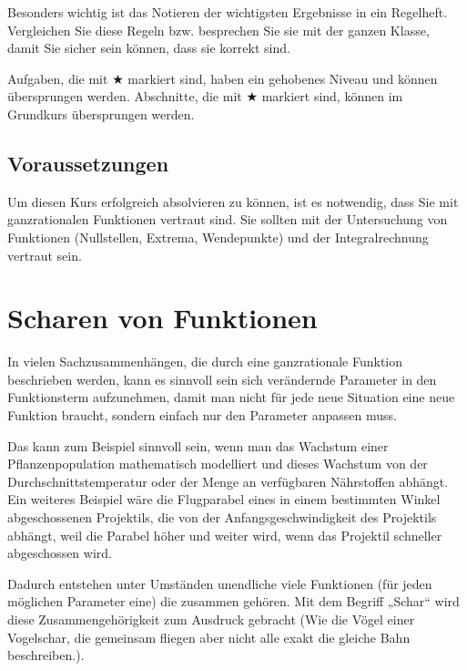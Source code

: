 \documentclass[11pt,a4paper,twoside,fleqn]{article}
\begin{document}
Besonders wichtig ist das Notieren der wichtigsten Ergebnisse in ein
Regelheft. Vergleichen Sie diese Regeln bzw. besprechen Sie sie mit
der ganzen Klasse, damit Sie sicher sein können, dass sie korrekt
sind.

Aufgaben, die mit $\bigstar$ markiert sind, haben ein gehobenes Niveau
und können übersprungen werden.
Abschnitte, die mit $\bigstar$ markiert sind, können im Grundkurs
übersprungen werden.

\subsection*{Voraussetzungen}
Um diesen Kurs erfolgreich absolvieren zu können, ist es notwendig,
dass Sie mit ganzrationalen Funktionen vertraut sind. Sie sollten mit
der Untersuchung von Funktionen (Nullstellen, Extrema, Wendepunkte)
und der Integralrechnung vertraut sein. 
\tableofcontents

\section{Scharen von Funktionen}
In vielen Sachzusammenhängen, die durch eine ganzrationale Funktion
beschrieben werden, kann es sinnvoll sein sich verändernde Parameter
in den Funktionsterm aufzunehmen, damit man nicht für jede neue
Situation eine neue Funktion braucht, sondern einfach nur den
Parameter anpassen muss.

Das kann zum Beispiel sinnvoll sein, wenn man das Wachstum einer
Pflanzenpopulation mathematisch modelliert und dieses Wachstum von
der Durchschnittstemperatur oder der Menge an verfügbaren Nährstoffen
abhängt. \\
Ein weiteres Beispiel wäre die Flugparabel eines in einem bestimmten
Winkel abgeschossenen Projektils, die von der Anfangsgeschwindigkeit
des Projektils abhängt, weil die Parabel höher und weiter wird, wenn
das Projektil schneller abgeschossen wird.

Dadurch entstehen unter Umständen unendliche viele Funktionen (für
jeden möglichen Parameter eine) die zusammen gehören. Mit dem Begriff
„Schar“ wird diese Zusammengehörigkeit zum Ausdruck gebracht (Wie die
Vögel einer Vogelschar, die gemeinsam fliegen aber nicht alle exakt
die gleiche Bahn beschreiben.).
\end{document}
